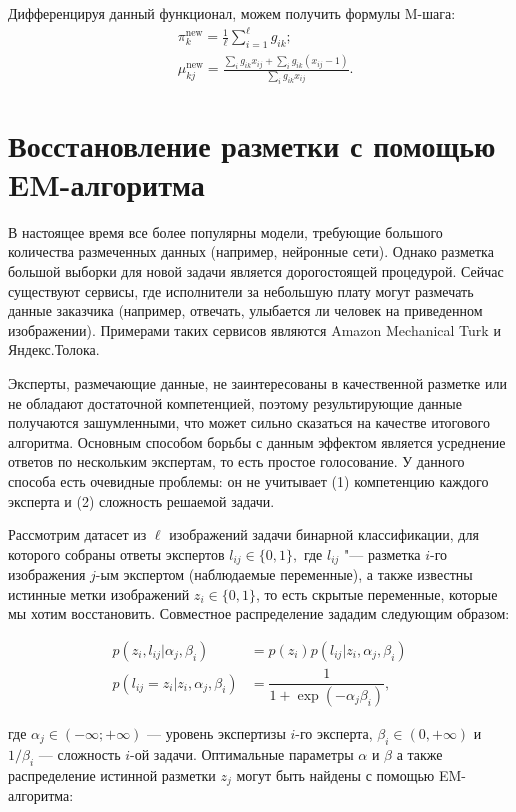\documentclass[12pt,a4paper]{article}
\begin{document}
Дифференцируя данный функционал, можем получить формулы M-шага:
\begin{align*}
	&\pi_k^{\text{new}} = \frac{1}{\ell} \sum_{i = 1}^{\ell}g_{ik};\\
	&\mu_{kj}^{\text{new}} = \frac{\sum_i g_{ik}x_{ij} + \sum_i g_{ik}(x_{ij}-1)}{\sum_i g_{ik}x_{ij}}.
\end{align*}

\section{Восстановление разметки с помощью EM-алгоритма}
\par В настоящее время все более популярны модели, требующие большого количества размеченных данных (например, нейронные сети).
Однако разметка большой выборки для новой задачи является дорогостоящей процедурой.
Сейчас существуют сервисы, где исполнители за небольшую плату могут размечать данные заказчика (например, отвечать, улыбается ли человек на приведенном изображении). Примерами таких сервисов являются Amazon Mechanical Turk и Яндекс.Толока.

\par Эксперты, размечающие данные, не заинтересованы в качественной разметке или не обладают достаточной компетенцией, поэтому результирующие данные получаются зашумленными, что может сильно сказаться на качестве итогового алгоритма.
Основным способом борьбы с данным эффектом является усреднение ответов по нескольким экспертам, то есть простое голосование.
У данного способа есть очевидные проблемы: он не учитывает (1) компетенцию каждого эксперта и (2) сложность решаемой задачи.

Рассмотрим датасет из $\ell$ изображений задачи бинарной классификации, для которого собраны ответы экспертов $l_{ij} \in \{0, 1\},$ где $l_{ij}$ "--- разметка $i$-го изображения $j$-ым экспертом (наблюдаемые переменные), а также известны истинные метки изображений $z_i \in \{0, 1\}$, то есть скрытые переменные, которые мы хотим восстановить.
Совместное распределение зададим следующим образом:

\begin{align*}
p(z_{i}, l_{ij} | \alpha_j, \beta_i) &= p(z_i) p(l_{ij} | z_{i}, \alpha_j, \beta_i) \\
p(l_{ij} = z_{i}| z_{i}, \alpha_j, \beta_i) &= \dfrac{1}{1 + \exp(-\alpha_j\beta_i)},
\end{align*}

где $\alpha_j \in (-\infty; +\infty)$ --- уровень экспертизы $i$-го эксперта, $\beta_i \in (0, +\infty)$ и $1/\beta_i$ --- сложность $i$-ой задачи.
Оптимальные параметры $\alpha$ и $\beta$ а также распределение истинной разметки $z_{j}$ могут быть найдены с помощью EM-алгоритма:
\end{document}
